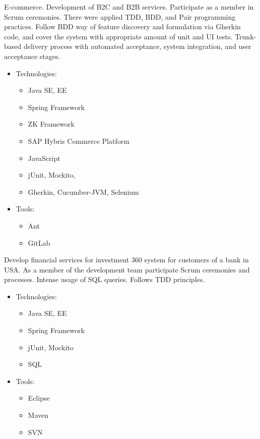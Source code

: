 \documentclass[11pt, a4paper]{moderncv}
\begin{document}
{E-commerce. Development of B2C and B2B services. Participate as a member in Scrum ceremonies. There were applied TDD, BDD, and Pair programming practices. Follow BDD way of feature discovery and formulation via Gherkin code, and cover the system with appropriate amount of unit and UI tests. Trunk-based delivery process with automated acceptance, system integration, and user acceptance stages.
\begin{itemize}
\item Technologies:
\begin{itemize}
\item Java SE, EE
\item Spring Framework
\item ZK Framework
\item SAP Hybris Commerce Platform
\item JavaScript
\item jUnit, Mockito, 
\item Gherkin, Cucumber-JVM, Selenium
\end{itemize}
\item Tools:
\begin{itemize}
\item Ant
\item GitLab
\end{itemize}
\end{itemize}}

{Develop financial services for investment 360 system for customers of a bank in USA. As a member of the development team participate Scrum ceremonies and processes. Intense usage of SQL queries. Follows TDD principles.
\begin{itemize}
\item Technologies:
\begin{itemize}
\item Java SE, EE
\item Spring Framework
\item jUnit, Mockito
\item SQL
\end{itemize}
\item Tools:
\begin{itemize}
\item Eclipse
\item Maven
\item SVN
\end{itemize}
\end{itemize}}
\end{document}
